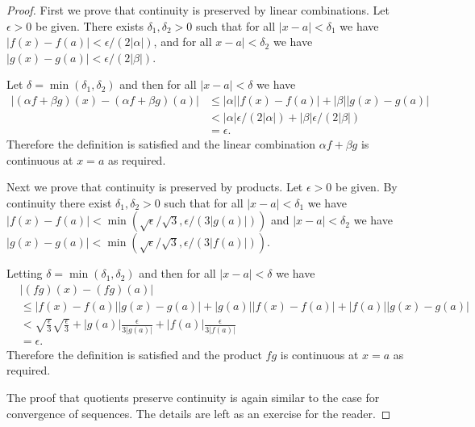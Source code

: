 \documentclass[extrafontsizes, twoside, a4paper]{memoir}
\theoremstyle{plain}%
\theoremstyle{definition}
\theoremstyle{remark}
\begin{document}
\begin{proof}First we prove that continuity is preserved by linear combinations.
Let $\epsilon>0$ be given.
There exists $\delta_1, \delta_2 > 0$ such that for all $|x-a|<\delta_1$ we have $|f(x) - f(a)|<\epsilon/(2|\alpha|)$, and for all $x - a|<\delta_2$ we have $|g(x)-g(a)|<\epsilon/(2|\beta|)$.

Let $\delta = \min(\delta_1, \delta_2)$ and then for all $|x-a|<\delta$ we have
\begin{align*}
|\left ( \alpha f + \beta g \right )(x) - \left ( \alpha f + \beta g \right )(a)|
&\leq |\alpha||f(x) - f(a)| + |\beta||g(x) - g(a)|\\
&< |\alpha|\epsilon/(2|\alpha|) +  |\beta|\epsilon/(2|\beta|)\\
&= \epsilon .
\end{align*}
Therefore the definition is satisfied and the linear combination $\alpha f + \beta g$ is continuous at $x=a$ as required.

Next we prove that continuity is preserved by products. Let $\epsilon >0$ be given. By continuity there exist $\delta_1, \delta_2 > 0$ such that for all $|x-a|<\delta_1$ we have $|f(x)-f(a)| < \min\left (\sqrt{\epsilon}/\sqrt{3}, \epsilon/(3|g(a)|)\right )$ and $|x-a|<\delta_2$ we have $|g(x)-g(a)| < \min\left (\sqrt{\epsilon}/\sqrt{3}, \epsilon/(3|f(a)|)\right )$.

Letting $\delta = \min(\delta_1, \delta_2)$ and then for all $|x-a|<\delta$ we have
\begin{align*}
&|\left ( fg \right )(x) - \left ( fg\right )(a)|\\
&\leq |f(x) - f(a)||g(x) - g(a)| + |g(a)||f(x) - f(a)| + |f(a)||g(x) - g(a)|\\
&< \sqrt{\frac{\epsilon}{3}}\sqrt{\frac{\epsilon}{3}} + |g(a)|\frac{\epsilon}{3|g(a)|} + |f(a)|\frac{\epsilon}{3|f(a)|}  \\
&= \epsilon .
\end{align*}
Therefore the definition is satisfied and the product $fg$ is continuous at $x=a$ as required.

The proof that quotients preserve continuity is again similar to the case for convergence of sequences. The details are left as an exercise for the reader.
\end{proof}
\vspace{\baselineskip}
\end{document}
